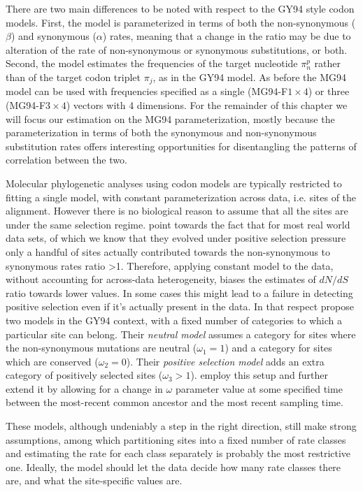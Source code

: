There are two main differences to be noted with respect to the GY94 style codon models.
First, the model is parameterized in terms of both the non-synonymous ($\beta$) and synonymous ($\alpha$) rates, meaning that a change in the ratio may be due to alteration of the rate of non-synonymous or synonymous substitutions, or both.
Second, the model estimates the frequencies of the target nucleotide $\pi_{n}^{p}$ rather than of the target codon triplet $\pi_{j}$, as in the GY94 model.
As before the MG94 model can be used with frequencies specified as a single (MG94-F$1\times4$) or three (MG94-F$3\times4$) vectors with 4 dimensions.
For the remainder of this chapter we will focus our estimation on the MG94 parameterization, mostly because the parameterization in terms of both the synonymous and non-synonymous substitution rates offers interesting opportunities for disentangling the patterns of correlation between the two.

Molecular phylogenetic analyses using codon models are typically restricted to fitting a single model, with constant parameterization across data, i.e. sites of the alignment.
However there is no biological reason to assume that all the sites are under the same selection regime.
\cite{NY98} point towards the fact that for most real world data sets, of which we know that they evolved under positive selection pressure only a handful of sites actually contributed towards the non-synonymous to synonymous rates ratio >1.
Therefore, applying constant model to the data, without accounting for across-data heterogeneity, biases the estimates of $dN/dS$ ratio towards lower values.
In some cases this might lead to a failure in detecting positive selection even if it's actually present in the data.  
In that respect \cite{NY98} propose two models in the GY94 context, with a fixed number of categories to which a particular site can belong.
Their \emph{neutral model} assumes a category for sites where the non-synonymous mutations are neutral ($\omega_1=1$) and a category for sites which are conserved ($\omega_2=0$).
Their \emph{positive selection model} adds an extra category of positively selected sites ($\omega_3>1$).
\cite{Goode2008} employ this setup and further extend it by allowing for a change in $\omega$ parameter value at some specified time between the most-recent common ancestor and the most recent sampling time.

These models, although undeniably a step in the right direction, still make strong assumptions, among which partitioning sites into a fixed number of rate classes and estimating the rate for each class separately is probably the most restrictive one.
Ideally, the model should let the data decide how many rate classes there are, and what the site-specific values are.

